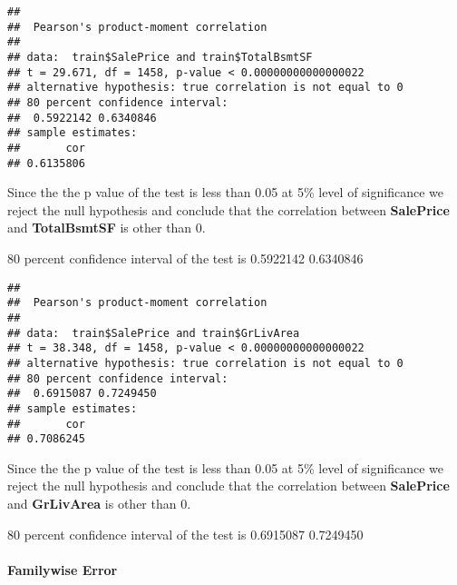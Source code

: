 \documentclass[]{article}
\newenvironment{Shaded}{\begin{snugshade}}{\end{snugshade}}
\newcommand{\KeywordTok}[1]{\textcolor[rgb]{0.13,0.29,0.53}{\textbf{#1}}}
\newcommand{\DataTypeTok}[1]{\textcolor[rgb]{0.13,0.29,0.53}{#1}}
\newcommand{\FloatTok}[1]{\textcolor[rgb]{0.00,0.00,0.81}{#1}}
\newcommand{\OperatorTok}[1]{\textcolor[rgb]{0.81,0.36,0.00}{\textbf{#1}}}
\newcommand{\NormalTok}[1]{#1}
\let\oldparagraph\paragraph
\renewcommand{\paragraph}[1]{\oldparagraph{#1}\mbox{}}
\begin{document}
\begin{Shaded}
\end{Shaded}

\begin{verbatim}
## 
##  Pearson's product-moment correlation
## 
## data:  train$SalePrice and train$TotalBsmtSF
## t = 29.671, df = 1458, p-value < 0.00000000000000022
## alternative hypothesis: true correlation is not equal to 0
## 80 percent confidence interval:
##  0.5922142 0.6340846
## sample estimates:
##       cor 
## 0.6135806
\end{verbatim}

Since the the p value of the test is less than 0.05 at 5\% level of
significance we reject the null hypothesis and conclude that the
correlation between \textbf{SalePrice} and \textbf{TotalBsmtSF} is other
than 0.

80 percent confidence interval of the test is 0.5922142 0.6340846

\begin{Shaded}
\end{Shaded}

\begin{verbatim}
## 
##  Pearson's product-moment correlation
## 
## data:  train$SalePrice and train$GrLivArea
## t = 38.348, df = 1458, p-value < 0.00000000000000022
## alternative hypothesis: true correlation is not equal to 0
## 80 percent confidence interval:
##  0.6915087 0.7249450
## sample estimates:
##       cor 
## 0.7086245
\end{verbatim}

Since the the p value of the test is less than 0.05 at 5\% level of
significance we reject the null hypothesis and conclude that the
correlation between \textbf{SalePrice} and \textbf{GrLivArea} is other
than 0.

80 percent confidence interval of the test is 0.6915087 0.7249450

\paragraph{Familywise Error}\label{familywise-error}
\end{document}
